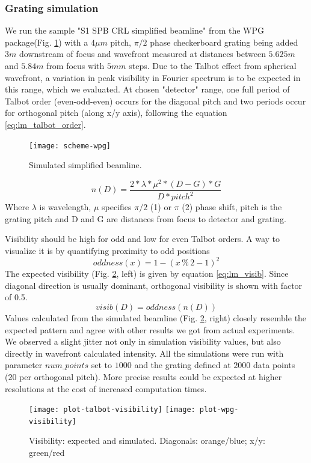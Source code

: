 \documentclass[10pt]{scrartcl}
\begin{document}
\subsubsection{Grating simulation}
We run the sample "S1 SPB CRL simplified beamline" from the WPG package(Fig. \ref{fig:lm_wpg_beamline}) with a $4\mu m$ pitch, $\pi/2$ phase checkerboard grating being added $3m$ downstream of focus and wavefront measured at distances between $5.625m$ and $5.84m$ from focus with $5mm$ steps. Due to the Talbot effect from spherical wavefront, a variation in peak visibility in Fourier spectrum is to be expected in this range, which we evaluated.
At chosen "detector" range, one full period of Talbot order (even-odd-even) occurs for the diagonal pitch and two periods occur for orthogonal pitch (along x/y axis), following the equation \ref{eq:lm_talbot_order}.
%
\begin{figure}[ht]
	\begin{center}
		\texttt{[image: scheme-wpg]}
	\end{center}
	\caption{Simulated simplified beamline.}
	\label{fig:lm_wpg_beamline}
\end{figure}
%
\begin{equation}
n(D) = \frac{2* \lambda * \mu ^2 * (D-G) * G}{D * pitch ^2}
\label{eq:lm_talbot_order}
\end{equation}
Where $\lambda$ is wavelength, $\mu$ specifies $\pi/2$ (1) or $\pi$ (2) phase shift, pitch is the grating pitch and D and G are distances from focus to detector and grating.

Visibility should be high for odd and low for even Talbot orders. A way to visualize it is by quantifying proximity to odd positions%
%
\begin{equation*}
oddness(x) = 1-(x  \mathbin{\%}  2 - 1)^2
\end{equation*}
%
The expected visibility (Fig. \ref{fig:lm_visib}, left) is given by equation \ref{eq:lm_visib}. Since diagonal direction is usually dominant, orthogonal visibility is shown with factor of 0.5.
%
\begin{equation}
  visib(D) = oddness\left(n(D) \right)
  \label{eq:lm_visib}
\end{equation}
%
Values calculated from the simulated beamline (Fig. \ref{fig:lm_visib}, right) closely resemble the expected pattern and agree with other results we got from actual experiments.
We observed a slight jitter not only in simulation visibility values, but also directly in wavefront calculated intensity. All the simulations were run with parameter $num\_points$ set to $1000$ and the grating defined at $2000$ data points (20 per orthogonal pitch). More precise results could be expected at higher resolutions at the cost of increased computation times.
%
\begin{figure}[ht]
	\begin{center}
		\texttt{[image: plot-talbot-visibility]}
		\texttt{[image: plot-wpg-visibility]}
	\end{center}
	\caption{Visibility: expected and simulated. Diagonals: orange/blue; x/y: green/red}
	\label{fig:lm_visib}
\end{figure}
%
\FloatBarrier
%
\end{document}
